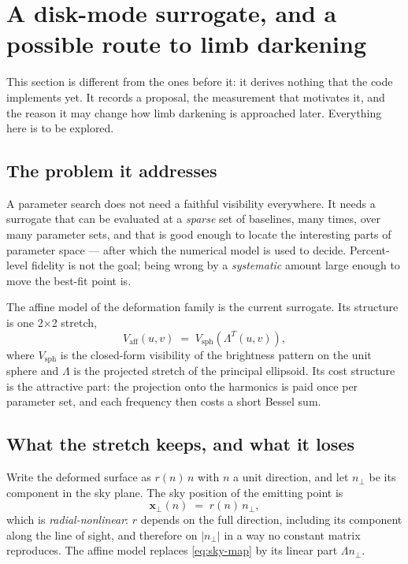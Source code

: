 
\section{A disk-mode surrogate, and a possible route to limb darkening}
\label{sec:disk-modes}

This section is different from the ones before it: it derives nothing that the code
implements yet.  It records a proposal, the measurement that motivates it, and the reason
it may change how limb darkening is approached later.  Everything here is to be explored.

\subsection{The problem it addresses}
\label{sec:disk-modes-problem}

A parameter search does not need a faithful visibility everywhere.  It needs a surrogate
that can be evaluated at a \emph{sparse} set of baselines, many times, over many parameter
sets, and that is good enough to locate the interesting parts of parameter space --- after
which the numerical model is used to decide.  Percent-level fidelity is not the goal;
being wrong by a \emph{systematic} amount large enough to move the best-fit point is.

The affine model of the deformation family is the current surrogate.  Its structure is one
2$\times$2 stretch,
\begin{equation}
  V_\text{aff}(u,v) \;=\; V_\text{sph}\!\left(\Lambda^{T}(u,v)\right) ,
  \label{eq:affine-surrogate}
\end{equation}
where $V_\text{sph}$ is the closed-form visibility of the brightness pattern on the unit
sphere and $\Lambda$ is the projected stretch of the principal ellipsoid.  Its cost
structure is the attractive part: the projection onto the harmonics is paid once per
parameter set, and each frequency then costs a short Bessel sum.

\subsection{What the stretch keeps, and what it loses}
\label{sec:disk-modes-error}

Write the deformed surface as $r(n)\,n$ with $n$ a unit direction, and let $n_\perp$ be its
component in the sky plane.  The sky position of the emitting point is
\begin{equation}
  \mathbf{x}_\perp(n) \;=\; r(n)\, n_\perp ,
  \label{eq:sky-map}
\end{equation}
which is \emph{radial-nonlinear}: $r$ depends on the full direction, including its
component along the line of sight, and therefore on $|n_\perp|$ in a way no constant matrix
reproduces.  The affine model replaces \eqref{eq:sky-map} by its linear part
$\Lambda n_\perp$.

